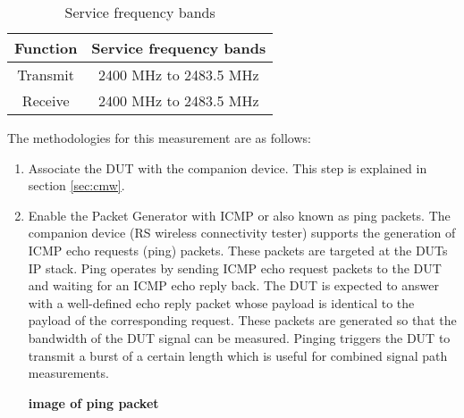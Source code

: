 \begin{table}[ht]
\begin{center}
\begin {tabular} {|c|c|} 
\toprule
Function & Service frequency bands \\ 
\midrule 
Transmit & 2400 MHz to 2483.5 MHz \\
Receive & 2400 MHz to 2483.5 MHz \\
\bottomrule
\end{tabular} 
\caption{Service frequency bands}
\label{tab:bands}
\end{center}
\end{table}
The methodologies for this measurement are as follows:
\begin{enumerate}
  \item Associate the \acs{DUT} with the companion device. This step is explained in section \ref{sec:cmw}.
   \item Enable the Packet Generator with \acs{ICMP} or also known as ping packets. The companion device (\acs{RS}\textregistered{} wireless connectivity tester) supports the generation of \acs{ICMP} echo requests (ping) packets. These packets are targeted at the \acsp{DUT} \acs{IP} stack. Ping operates by sending \acs{ICMP} echo request packets to the \acs{DUT} and waiting for an \acs{ICMP} echo reply back. The \acs{DUT} is expected to answer with a well-defined echo reply packet whose payload is identical to the payload of the corresponding request. These packets are generated so that the bandwidth of the \acs{DUT} signal can be measured. Pinging triggers the \acs{DUT} to transmit a burst of a certain length which is useful for combined signal path measurements.

\textbf{image of ping packet}



\end{enumerate}
